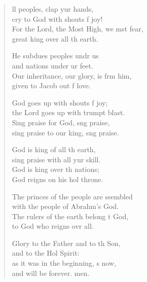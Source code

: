 \settowidth{\versewidth}{For the Lord, the Most High, we must fear, *}
\begin{verse}%
  \begin{patverse}
    ll peoples, clap yur hands,\Med\\
cry to God with shouts f joy!\\
For the Lord, the Most High, we mst fear,\Med\\
great king over all th earth.

He subdues peoples undr us\Med\\
and nations under ur feet.\\
Our inheritance, our glory, is frm him,\Med\\
given to Jacob out f love.

God goes up with shouts f joy;\Med\\
the Lord goes up with trumpt blast.\\
Sing praise for God, s\pointup{\i}ng praise,\Med\\
sing praise to our king, s\pointup{\i}ng praise.

God is king of all th earth,\Med\\
sing praise with all yur skill.\\
God is king over th nations;\Med\\
God reigns on his hol throne.

The princes of the people are ssembled\Med\\
with the people of Abrahm’s God.\\
The rulers of the earth belong t God,\Med\\
to God who reigns ovr all.

Glory to the Father and to th Son,\Med\\
and to the Hol Spirit:\\
as it was in the beginning, \pointup{\i}s now,\Med\\
and will be forever. men. 
  \end{patverse}
\end{verse}
